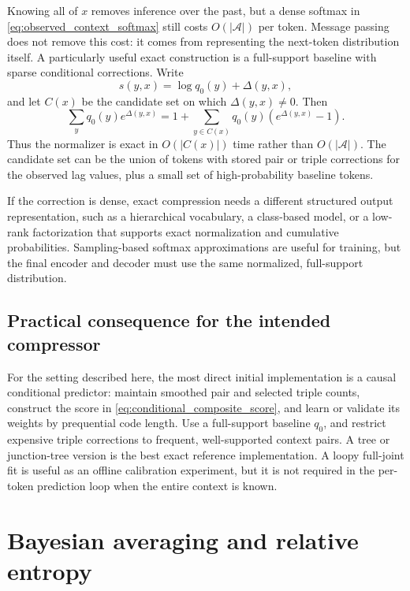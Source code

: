 \documentclass[11pt]{article}
\newcommand{\1}{\mathbf 1}
\newcommand{\mcA}{\mathcal A}
\begin{document}
Knowing all of \(x\) removes inference over the past, but a dense softmax in
\eqref{eq:observed_context_softmax} still costs \(O(\lvert\mcA\rvert)\) per
token.  Message passing does not remove this cost: it comes from representing
the next-token distribution itself.  A particularly useful exact construction
is a full-support baseline with sparse conditional corrections.  Write
\[
  s(y,x)=\log q_0(y)+\Delta(y,x),
\]
and let \(C(x)\) be the candidate set on which \(\Delta(y,x)\ne 0\).  Then
\begin{equation}
  \sum_y q_0(y)e^{\Delta(y,x)}
  =
  1+\sum_{y\in C(x)}q_0(y)
     \left(e^{\Delta(y,x)}-1\right).
  \label{eq:sparse_normalizer}
\end{equation}
Thus the normalizer is exact in \(O(\lvert C(x)\rvert)\) time rather than
\(O(\lvert\mcA\rvert)\).  The candidate set can be the union of tokens with
stored pair or triple corrections for the observed lag values, plus a small
set of high-probability baseline tokens.

If the correction is dense, exact compression needs a different structured
output representation, such as a hierarchical vocabulary, a class-based
model, or a low-rank factorization that supports exact normalization and
cumulative probabilities.  Sampling-based softmax approximations are useful
for training, but the final encoder and decoder must use the same normalized,
full-support distribution.

\subsection{Practical consequence for the intended compressor}

For the setting described here, the most direct initial implementation is a
causal conditional predictor: maintain smoothed pair and selected triple
counts, construct the score in \eqref{eq:conditional_composite_score}, and
learn or validate its weights by prequential code length.  Use a full-support
baseline \(q_0\), and restrict expensive triple corrections to frequent,
well-supported context pairs.  A tree or junction-tree version is the best
exact reference implementation.  A loopy full-joint fit is useful as an
offline calibration experiment, but it is not required in the per-token
prediction loop when the entire context is known.

\section{Bayesian averaging and relative entropy}
\end{document}
